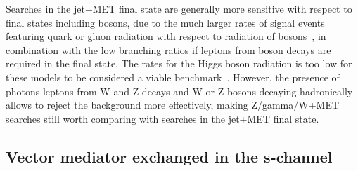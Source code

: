 Searches in the jet+MET final state are generally more sensitive
with respect to final states including bosons, due to the much
larger rates of signal events featuring quark or gluon radiation with
respect to radiation of bosons~\cite{Zhou:2013fla},
in combination with the low branching ratios if leptons from
boson decays are required in the final state.
The rates for the Higgs boson radiation is too low for these models
to be considered a viable benchmark~\cite{Carpenter:2013xra}.
However, the presence of photons
leptons from W and Z decays
and W or Z bosons decaying hadronically
allows to reject the background more effectively, making Z/gamma/W+MET searches
still worth comparing with searches in the jet+MET final state.


\subsection{Vector mediator exchanged in the s-channel}

